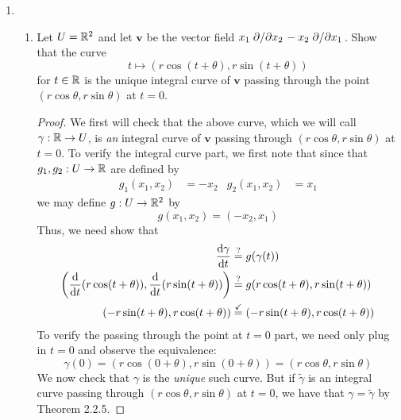 \documentclass[../psets.tex]{subfiles}
\begin{document}
\begin{enumerate}[label={\textbf{2.2.\roman*.}}]
\begin{enumerate}
\begin{proof}
        \end{proof}
    \end{enumerate}
    \item 
    \begin{enumerate}
        \item Let $U=\mathbb{R}^2$ and let $\bm{v}$ be the vector field $x_1\pdv*{x_2}-x_2\pdv*{x_1}$. Show that the curve
        \begin{equation*}
            t \mapsto (r\cos(t+\theta),r\sin(t+\theta))
        \end{equation*}
        for $t\in\mathbb{R}$ is the unique integral curve of $\bm{v}$ passing through the point $(r\cos\theta,r\sin\theta)$ at $t=0$.
        \begin{proof}
            We first will check that the above curve, which we will call $\gamma:\mathbb{R}\to U$, is \emph{an} integral curve of $\bm{v}$ passing through $(r\cos\theta,r\sin\theta)$ at $t=0$. To verify the integral curve part, we first note that since that $g_1,g_2:U\to\mathbb{R}$ are defined by
            \begin{align*}
                g_1(x_1,x_2) &= -x_2&
                g_2(x_1,x_2) &= x_1
            \end{align*}
            we may define $g:U\to\mathbb{R}^2$ by
            \begin{equation*}
                g(x_1,x_2) = (-x_2,x_1)
            \end{equation*}
            Thus, we need show that
            \begin{align*}
                \dv{\gamma}{t} &\stackrel{?}{=} g(\gamma(t))\\
                \left( \dv{t}(r\cos(t+\theta)),\dv{t}(r\sin(t+\theta)) \right) &\stackrel{?}{=} g(r\cos(t+\theta),r\sin(t+\theta))\\
                \left( -r\sin(t+\theta),r\cos(t+\theta) \right) &\stackrel{\checkmark}{=} \left( -r\sin(t+\theta),r\cos(t+\theta) \right)
            \end{align*}
            To verify the passing through the point at $t=0$ part, we need only plug in $t=0$ and observe the equivalence:
            \begin{equation*}
                \gamma(0) = (r\cos(0+\theta),r\sin(0+\theta))
                = (r\cos\theta,r\sin\theta)
            \end{equation*}
            We now check that $\gamma$ is the \emph{unique} such curve. But if $\tilde{\gamma}$ is an integral curve passing through $(r\cos\theta,r\sin\theta)$ at $t=0$, we have that $\gamma=\tilde{\gamma}$ by Theorem 2.2.5. 

\end{proof}
\end{enumerate}
\end{enumerate}
\end{document}
